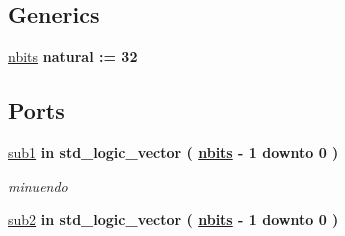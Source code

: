 \subsection*{Generics}
 \begin{DoxyCompactItemize}
\item 
\hyperlink{group___subtractor_gae1435c07d0cd54b521535e2f8de6f94e}{nbits} {\bfseries {\bfseries \textcolor{vhdlchar}{natural}\textcolor{vhdlchar}{ }\textcolor{vhdlchar}{ }\textcolor{vhdlchar}{\+:}\textcolor{vhdlchar}{=}\textcolor{vhdlchar}{ }\textcolor{vhdlchar}{ } \textcolor{vhdldigit}{32} \textcolor{vhdlchar}{ }}}
\end{DoxyCompactItemize}
\subsection*{Ports}
 \begin{DoxyCompactItemize}
\item 
\hyperlink{group___subtractor_ga49536ce3d87a5522d2d82cc34985d648}{sub1}  {\bfseries {\bfseries \textcolor{vhdlchar}{in}\textcolor{vhdlchar}{ }}} {\bfseries \textcolor{vhdlchar}{std\+\_\+logic\+\_\+vector}\textcolor{vhdlchar}{ }\textcolor{vhdlchar}{(}\textcolor{vhdlchar}{ }\textcolor{vhdlchar}{ }\textcolor{vhdlchar}{ }\textcolor{vhdlchar}{ }{\bfseries \hyperlink{group___subtractor_gae1435c07d0cd54b521535e2f8de6f94e}{nbits}} \textcolor{vhdlchar}{-\/}\textcolor{vhdlchar}{ } \textcolor{vhdldigit}{1} \textcolor{vhdlchar}{ }\textcolor{vhdlchar}{downto}\textcolor{vhdlchar}{ }\textcolor{vhdlchar}{ } \textcolor{vhdldigit}{0} \textcolor{vhdlchar}{ }\textcolor{vhdlchar}{)}\textcolor{vhdlchar}{ }} 
\begin{DoxyCompactList}\small\item\em minuendo \end{DoxyCompactList}\item 
\hyperlink{group___subtractor_ga0c49fa677895a036f45dd76f988d18c5}{sub2}  {\bfseries {\bfseries \textcolor{vhdlchar}{in}\textcolor{vhdlchar}{ }}} {\bfseries \textcolor{vhdlchar}{std\+\_\+logic\+\_\+vector}\textcolor{vhdlchar}{ }\textcolor{vhdlchar}{(}\textcolor{vhdlchar}{ }\textcolor{vhdlchar}{ }\textcolor{vhdlchar}{ }\textcolor{vhdlchar}{ }{\bfseries \hyperlink{group___subtractor_gae1435c07d0cd54b521535e2f8de6f94e}{nbits}} \textcolor{vhdlchar}{-\/}\textcolor{vhdlchar}{ } \textcolor{vhdldigit}{1} \textcolor{vhdlchar}{ }\textcolor{vhdlchar}{downto}\textcolor{vhdlchar}{ }\textcolor{vhdlchar}{ } \textcolor{vhdldigit}{0} \textcolor{vhdlchar}{ }\textcolor{vhdlchar}{)}\textcolor{vhdlchar}{ }} 

\end{DoxyCompactItemize}
